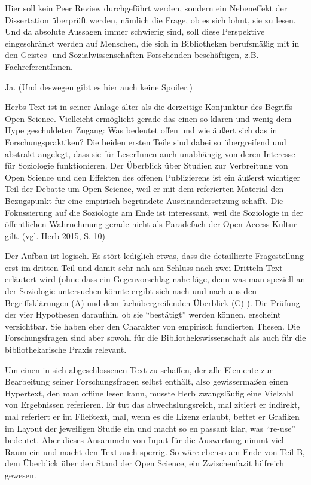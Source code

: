 \documentclass[a4paper,
fontsize=11pt,
oneside,
numbers=noperiodatend,
parskip=half-,
bibliography=totoc,
final
]{scrartcl}
\begin{document}
Hier soll kein Peer Review durchgeführt werden, sondern ein Nebeneffekt
der Dissertation überprüft werden, nämlich die Frage, ob es sich lohnt,
sie zu lesen. Und da absolute Aussagen immer schwierig sind, soll diese
Perspektive eingeschränkt werden auf Menschen, die sich in Bibliotheken
berufsmäßig mit in den Geistes- und Sozialwissenschaften Forschenden
beschäftigen, z.B. FachreferentInnen.

Ja. (Und deswegen gibt es hier auch keine Spoiler.)

Herbs Text ist in seiner Anlage älter als die derzeitige Konjunktur des
Begriffs Open Science. Vielleicht ermöglicht gerade das einen so klaren
und wenig dem Hype geschuldeten Zugang: Was bedeutet offen und wie
äußert sich das in Forschungspraktiken? Die beiden ersten Teile sind
dabei so übergreifend und abstrakt angelegt, dass sie für LeserInnen
auch unabhängig von deren Interesse für Soziologie funktionieren. Der
Überblick über Studien zur Verbreitung von Open Science und den Effekten
des offenen Publizierens ist ein äußerst wichtiger Teil der Debatte um
Open Science, weil er mit dem referierten Material den Bezugspunkt für
eine empirisch begründete Auseinandersetzung schafft. Die Fokussierung
auf die Soziologie am Ende ist interessant, weil die Soziologie in der
öffentlichen Wahrnehmung gerade nicht als Paradefach der Open
Access-Kultur gilt. (vgl. Herb 2015, S. 10)

Der Aufbau ist logisch. Es stört lediglich etwas, dass die detaillierte
Fragestellung erst im dritten Teil und damit sehr nah am Schluss nach
zwei Dritteln Text erläutert wird (ohne dass ein Gegenvorschlag nahe
läge, denn was man speziell an der Soziologie untersuchen könnte ergibt
sich nach und nach aus den Begriffsklärungen (A) und dem
fachübergreifenden Überblick (C) ). Die Prüfung der vier Hypothesen
daraufhin, ob sie \enquote{bestätigt} werden können, erscheint
verzichtbar. Sie haben eher den Charakter von empirisch fundierten
Thesen. Die Forschungsfragen sind aber sowohl für die
Bibliothekswissenschaft als auch für die bibliothekarische Praxis
relevant.

Um einen in sich abgeschlossenen Text zu schaffen, der alle Elemente zur
Bearbeitung seiner Forschungsfragen selbst enthält, also gewissermaßen
einen Hypertext, den man offline lesen kann, musste Herb zwangsläufig
eine Vielzahl von Ergebnissen referieren. Er tut das abwechslungsreich,
mal zitiert er indirekt, mal referiert er im Fließtext, mal, wenn es die
Lizenz erlaubt, bettet er Grafiken im Layout der jeweiligen Studie ein
und macht so en passant klar, was \enquote{re-use} bedeutet. Aber dieses
Ansammeln von Input für die Auswertung nimmt viel Raum ein und macht den
Text auch sperrig. So wäre ebenso am Ende von Teil B, dem Überblick über
den Stand der Open Science, ein Zwischenfazit hilfreich gewesen.
\end{document}
